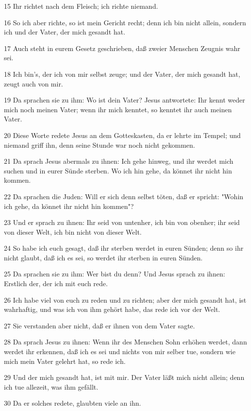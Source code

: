 \par 15 Ihr richtet nach dem Fleisch; ich richte niemand.
\par 16 So ich aber richte, so ist mein Gericht recht; denn ich bin nicht allein, sondern ich und der Vater, der mich gesandt hat.
\par 17 Auch steht in eurem Gesetz geschrieben, daß zweier Menschen Zeugnis wahr sei.
\par 18 Ich bin's, der ich von mir selbst zeuge; und der Vater, der mich gesandt hat, zeugt auch von mir.
\par 19 Da sprachen sie zu ihm: Wo ist dein Vater? Jesus antwortete: Ihr kennt weder mich noch meinen Vater; wenn ihr mich kenntet, so kenntet ihr auch meinen Vater.
\par 20 Diese Worte redete Jesus an dem Gotteskasten, da er lehrte im Tempel; und niemand griff ihn, denn seine Stunde war noch nicht gekommen.
\par 21 Da sprach Jesus abermals zu ihnen: Ich gehe hinweg, und ihr werdet mich suchen und in eurer Sünde sterben. Wo ich hin gehe, da könnet ihr nicht hin kommen.
\par 22 Da sprachen die Juden: Will er sich denn selbst töten, daß er spricht: "Wohin ich gehe, da könnet ihr nicht hin kommen"?
\par 23 Und er sprach zu ihnen: Ihr seid von untenher, ich bin von obenher; ihr seid von dieser Welt, ich bin nicht von dieser Welt.
\par 24 So habe ich euch gesagt, daß ihr sterben werdet in euren Sünden; denn so ihr nicht glaubt, daß ich es sei, so werdet ihr sterben in euren Sünden.
\par 25 Da sprachen sie zu ihm: Wer bist du denn? Und Jesus sprach zu ihnen: Erstlich der, der ich mit euch rede.
\par 26 Ich habe viel von euch zu reden und zu richten; aber der mich gesandt hat, ist wahrhaftig, und was ich von ihm gehört habe, das rede ich vor der Welt.
\par 27 Sie verstanden aber nicht, daß er ihnen von dem Vater sagte.
\par 28 Da sprach Jesus zu ihnen: Wenn ihr des Menschen Sohn erhöhen werdet, dann werdet ihr erkennen, daß ich es sei und nichts von mir selber tue, sondern wie mich mein Vater gelehrt hat, so rede ich.
\par 29 Und der mich gesandt hat, ist mit mir. Der Vater läßt mich nicht allein; denn ich tue allezeit, was ihm gefällt.
\par 30 Da er solches redete, glaubten viele an ihn.
